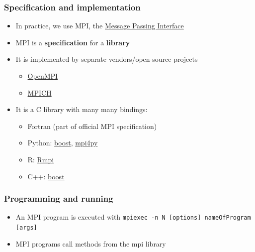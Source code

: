 \subsubsection{Specification and
implementation}\label{specification-and-implementation}

\begin{itemize}
\itemsep1pt\parskip0pt
\item
  In practice, we use MPI, the
  \href{http://en.wikipedia.org/wiki/Message_Passing_Interface}{Message
  Passing Interface}
\item
  MPI is a \textbf{specification} for a \textbf{library}
\item
  It is implemented by separate vendors/open-source projects

  \begin{itemize}
  \itemsep1pt\parskip0pt
  \item
    \href{http://www.open-mpi.org/}{OpenMPI}
  \item
    \href{http://www.mpich.org/}{MPICH}
  \end{itemize}
\item
  It is a C library with many many bindings:

  \begin{itemize}
  \itemsep1pt\parskip0pt
  \item
    Fortran (part of official MPI specification)
  \item
    Python:
    \href{http://www.boost.org/doc/libs/1_55_0/doc/html/mpi/python.html}{boost},
    \href{http://mpi4py.scipy.org/}{mpi4py}
  \item
    R:
    \href{http://cran.r-project.org/web/packages/Rmpi/index.html}{Rmpi}
  \item
    C++:
    \href{http://www.boost.org/doc/libs/1_57_0/doc/html/mpi.html}{boost}
  \end{itemize}
\end{itemize}

\subsubsection{Programming and running}\label{programming-and-running}

\begin{itemize}
\item
  An MPI program is executed with
  \texttt{mpiexec -n N {[}options{]} nameOfProgram {[}args{]}}
\item
  MPI programs call methods from the mpi library
\end{itemize}

